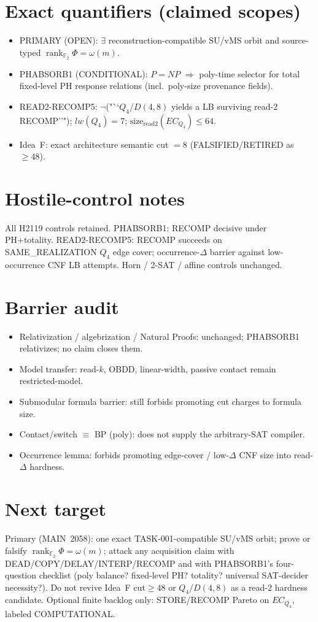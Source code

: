 \documentclass[11pt]{article}
\begin{document}
\section*{Exact quantifiers (claimed scopes)}
\begin{itemize}
\item PRIMARY (OPEN): $\exists$ reconstruction-compatible SU/vMS orbit and source-typed
  $\operatorname{rank}_{\mathbb F_2}\Phi=\omega(m)$.
\item PHABSORB1 (CONDITIONAL): $P=NP$ $\Rightarrow$ poly-time selector for total fixed-level PH
  response relations (incl.\ poly-size provenance fields).
\item READ2-RECOMP5: $\neg$("``$Q_4$/$D(4,8)$ yields a LB surviving read-$2$ RECOMP''");
  $lw(Q_4)=7$; $\mathrm{size}_{\mathrm{read2}}(EC_{Q_4})\le64$.
\item Idea~F: exact architecture semantic cut $=8$ (FALSIFIED/RETIRED as $\ge48$).
\end{itemize}

\section*{Hostile-control notes}
All H2119 controls retained. PHABSORB1: RECOMP decisive under PH+totality.
READ2-RECOMP5: RECOMP succeeds on SAME\_REALIZATION $Q_4$ edge cover; occurrence-$\Delta$ barrier
against low-occurrence CNF LB attempts. Horn / 2-SAT / affine controls unchanged.

\section*{Barrier audit}
\begin{itemize}
\item Relativization / algebrization / Natural Proofs: unchanged; PHABSORB1 relativizes;
  no claim closes them.
\item Model transfer: read-$k$, OBDD, linear-width, passive contact remain restricted-model.
\item Submodular formula barrier: still forbids promoting cut charges to formula size.
\item Contact/switch $\equiv$ BP (poly): does not supply the arbitrary-SAT compiler.
\item Occurrence lemma: forbids promoting edge-cover / low-$\Delta$ CNF size into read-$\Delta$ hardness.
\end{itemize}

\section*{Next target}
Primary (MAIN~2058): one exact TASK-001-compatible SU/vMS orbit; prove or falsify
$\operatorname{rank}_{\mathbb F_2}\Phi=\omega(m)$; attack any acquisition claim with
DEAD/COPY/DELAY/INTERP/RECOMP and with PHABSORB1's four-question checklist
(poly balance? fixed-level PH? totality? universal SAT-decider necessity?).
Do not revive Idea~F cut$\ge48$ or $Q_4$/$D(4,8)$ as a read-$2$ hardness candidate.
Optional finite backlog only: STORE/RECOMP Pareto on $EC_{Q_4}$, labeled COMPUTATIONAL.
\end{document}
